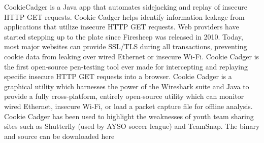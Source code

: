 CookieCadger is a Java app that automates sidejacking and replay of insecure HTTP GET requests. Cookie Cadger helps identify information leakage from applications that utilize insecure HTTP GET requests. Web providers have started stepping up to the plate since Firesheep was released in 2010. Today, most major websites can provide SSL/TLS during all transactions, preventing cookie data from leaking over wired Ethernet or insecure Wi-Fi. Cookie Cadger is the first open-source pen-testing tool ever made for intercepting and replaying specific insecure HTTP GET requests into a browser. Cookie Cadger is a graphical utility which harnesses the power of the Wireshark suite and Java to provide a fully cross-platform, entirely open-source utility which can monitor wired Ethernet, insecure Wi-Fi, or load a packet capture file for offline analysis. Cookie Cadger has been used to highlight the weaknesses of youth team sharing sites such as Shutterfly (used by AYSO soccer league) and TeamSnap. The binary and source can be downloaded here




\clearpage
























